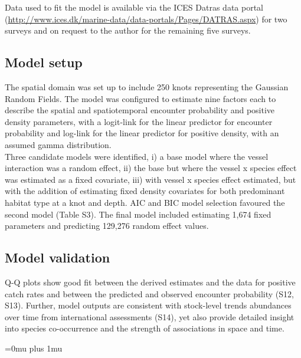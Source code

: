 \documentclass[fleqn,10pt]{wlscirep}
\begin{document}
\begin{linenumbers}
Data used to fit the model is available via the ICES Datras data portal
(\url{http://www.ices.dk/marine-data/data-portals/Pages/DATRAS.aspx}) for two
surveys and on request to the author for the remaining five surveys.\\

\subsection*{Model setup\\}

The spatial domain was set up to include 250 knots representing the Gaussian
Random Fields. The model was configured to estimate nine factors each to describe
the spatial and spatiotemporal encounter probability and positive density
parameters, with a logit-link for the linear predictor for encounter
probability and log-link for the linear predictor for positive density, with an
assumed gamma distribution.\\

Three candidate models were identified, i) a base model where the vessel
interaction was a random effect, ii) the base but where the vessel x species
effect was estimated as a fixed covariate, iii) with vessel x species effect
estimated, but with the addition of estimating fixed density covariates for
both predominant habitat type at a knot and depth. AIC and BIC model selection
favoured the second model (Table S3). The final model included estimating 1,674
fixed parameters and predicting 129,276 random effect values.\\

\subsection*{Model validation\\}

Q-Q plots show good fit between the derived estimates and the data for positive
catch rates and between the predicted and observed encounter probability (S12,
S13).  Further, model outputs are consistent with stock-level trends abundances
over time from international assessments (S14), yet also provide detailed
insight into species co-occurrence and the strength of associations in space
and time. \\

\end{linenumbers}
\newpage
\Urlmuskip=0mu plus 1mu\relax
%
\end{document}
